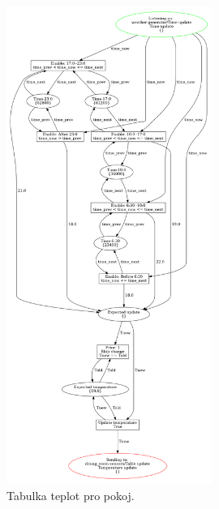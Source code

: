 \begin{figure}[htb]
  \centering
  \includegraphics[width=0.6\textwidth]{obrazky-figures/room-timetable.png}
  \caption{Tabulka teplot pro pokoj.}
  \label{room-table-viz}
\end{figure}

